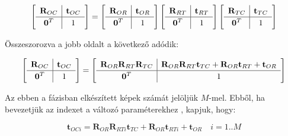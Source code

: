 	\begin{equation}
	\left[ 	\def\arraystretch{1.2} \begin{array}{c|c}
 	\mathbf{R}_{OC} & \mathbf{t}_{OC} \\ \hline
	\mathbf{0}^T & 1 \\
	\end{array}	\right] = 	
	\left[ \def\arraystretch{1.2} \begin{array}{c|c}
 	\mathbf{R}_{OR} & \mathbf{t}_{OR} \\ \hline
	\mathbf{0}^T & 1 \\
	\end{array}	\right]	
	\left[ \def\arraystretch{1.2} \begin{array}{c|c}
 	\mathbf{R}_{RT} & \mathbf{t}_{RT} \\ \hline
	\mathbf{0}^T & 1 \\
	\end{array}	\right]	
	\left[ \def\arraystretch{1.2} \begin{array}{c|c}
 	\mathbf{R}_{TC} & \mathbf{t}_{TC} \\ \hline
	\mathbf{0}^T & 1 \\
	\end{array}	\right]
	\end{equation}
	
	Összeszorozva a jobb oldalt a következő adódik:
	
	\begin{equation}	
	\left[ \def\arraystretch{1.2} \begin{array}{c|c}
 	\mathbf{R}_{OC} & \mathbf{t}_{OC} \\ \hline
	\mathbf{0}^T & 1 \\
	\end{array}	\right] = 
	\left[ \def\arraystretch{1.2} \begin{array}{c|c}
 	\mathbf{R}_{OR}\mathbf{R}_{RT}\mathbf{R}_{TC} & \mathbf{R}_{OR}\mathbf{R}_{RT}\mathbf{t}_{TC}+\mathbf{R}_{OR}\mathbf{t}_{RT} + \mathbf{t}_{OR} \\ \hline
	\mathbf{0}^T & 1 \\
	\end{array}	\right]
	\end{equation}
	
	Az ebben a fázisban elkészített képek számát jelöljük $M$-mel. Ebből, ha bevezetjük az indexet a változó paraméterekhez , kapjuk, hogy:
	
	\begin{equation}
	\mathbf{t}_{OCi} = \mathbf{R}_{OR}\mathbf{R}_{RTi}\mathbf{t}_{TC}+\mathbf{R}_{OR}\mathbf{t}_{RTi} + \mathbf{t}_{OR} \quad i=1..M
	\end{equation}
	
